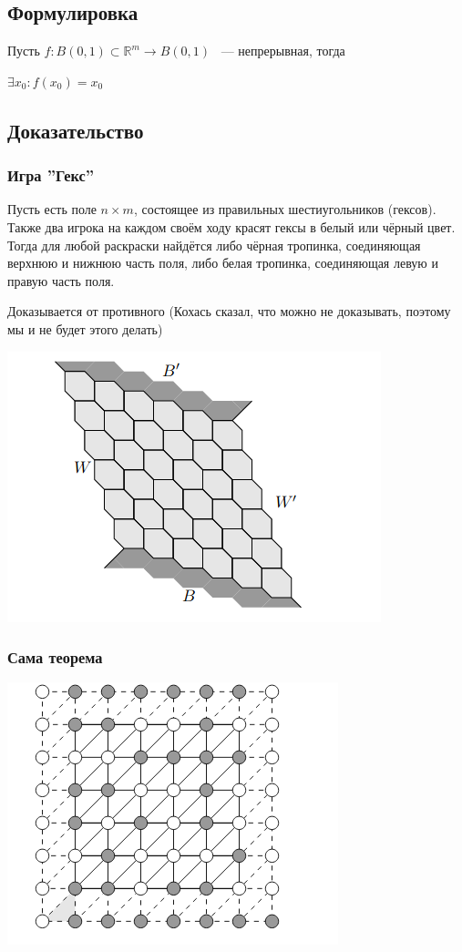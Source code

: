 \documentclass{article}
\begin{document}
		\subsection{Формулировка}
            
            Пусть $f: B(0, 1) \subset \mathbb{R}^m \rightarrow B(0, 1)$ ~--- непрерывная, тогда
		
            $\exists x_0 : f(x_0) = x_0$
		
		\subsection{Доказательство}
		
		\subsubsection{Игра ''Гекс''}
		
			Пусть есть поле $n \times m$, состоящее из правильных шестиугольников (гексов). Также два игрока на каждом своём ходу красят гексы в белый или чёрный цвет. Тогда для любой раскраски найдётся либо чёрная тропинка, соединяющая верхнюю и нижнюю часть поля, либо белая тропинка, соединяющая левую и правую часть поля.
			
			Доказывается от противного (Кохась сказал, что можно не доказывать, поэтому мы и не будет этого делать)
		
			\includegraphics[scale=0.5]{HEX.png}
				
		\subsubsection{Сама теорема}
		
			\includegraphics[scale=0.45]{NEWHEX.png}
		
\end{document}
